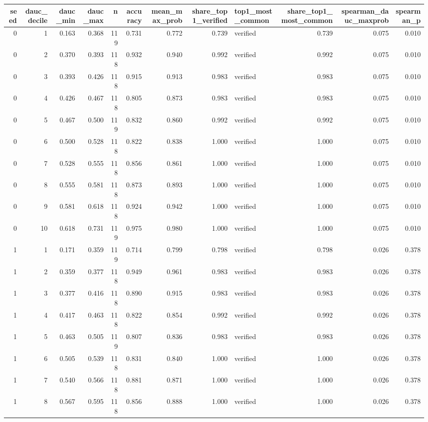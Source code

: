 \begin{tabular}{rrrrrrrrlrrr}
\toprule
seed & dauc_decile & dauc_min & dauc_max & n & accuracy & mean_max_prob & share_top1_verified & top1_most_common & share_top1_most_common & spearman_dauc_maxprob & spearman_p \\
\midrule
0 & 1 & 0.163 & 0.368 & 119 & 0.731 & 0.772 & 0.739 & verified & 0.739 & 0.075 & 0.010 \\
0 & 2 & 0.370 & 0.393 & 118 & 0.932 & 0.940 & 0.992 & verified & 0.992 & 0.075 & 0.010 \\
0 & 3 & 0.393 & 0.426 & 118 & 0.915 & 0.913 & 0.983 & verified & 0.983 & 0.075 & 0.010 \\
0 & 4 & 0.426 & 0.467 & 118 & 0.805 & 0.873 & 0.983 & verified & 0.983 & 0.075 & 0.010 \\
0 & 5 & 0.467 & 0.500 & 119 & 0.832 & 0.860 & 0.992 & verified & 0.992 & 0.075 & 0.010 \\
0 & 6 & 0.500 & 0.528 & 118 & 0.822 & 0.838 & 1.000 & verified & 1.000 & 0.075 & 0.010 \\
0 & 7 & 0.528 & 0.555 & 118 & 0.856 & 0.861 & 1.000 & verified & 1.000 & 0.075 & 0.010 \\
0 & 8 & 0.555 & 0.581 & 118 & 0.873 & 0.893 & 1.000 & verified & 1.000 & 0.075 & 0.010 \\
0 & 9 & 0.581 & 0.618 & 118 & 0.924 & 0.942 & 1.000 & verified & 1.000 & 0.075 & 0.010 \\
0 & 10 & 0.618 & 0.731 & 119 & 0.975 & 0.980 & 1.000 & verified & 1.000 & 0.075 & 0.010 \\
1 & 1 & 0.171 & 0.359 & 119 & 0.714 & 0.799 & 0.798 & verified & 0.798 & 0.026 & 0.378 \\
1 & 2 & 0.359 & 0.377 & 118 & 0.949 & 0.961 & 0.983 & verified & 0.983 & 0.026 & 0.378 \\
1 & 3 & 0.377 & 0.416 & 118 & 0.890 & 0.915 & 0.983 & verified & 0.983 & 0.026 & 0.378 \\
1 & 4 & 0.417 & 0.463 & 118 & 0.822 & 0.854 & 0.992 & verified & 0.992 & 0.026 & 0.378 \\
1 & 5 & 0.463 & 0.505 & 119 & 0.807 & 0.836 & 0.983 & verified & 0.983 & 0.026 & 0.378 \\
1 & 6 & 0.505 & 0.539 & 118 & 0.831 & 0.840 & 1.000 & verified & 1.000 & 0.026 & 0.378 \\
1 & 7 & 0.540 & 0.566 & 118 & 0.881 & 0.871 & 1.000 & verified & 1.000 & 0.026 & 0.378 \\
1 & 8 & 0.567 & 0.595 & 118 & 0.856 & 0.888 & 1.000 & verified & 1.000 & 0.026 & 0.378 \\

\end{tabular}
